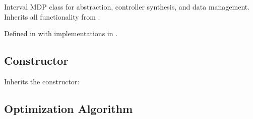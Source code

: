 \documentclass[a4paper,10pt,english]{sphinxmanual}
\begin{document}
\begin{fulllineitems}
\label{\detokenize{api/imdp:_CPPv44IMDP}}\label{\detokenize{api/imdp:_CPPv34IMDP}}\label{\detokenize{api/imdp:_CPPv24IMDP}}\label{\detokenize{api/imdp:IMDP}}
\pysigstartsignatures
\pysigstartmultiline
\pysigline
{}
\pysigstopmultiline
\pysigstopsignatures
\sphinxAtStartPar
Interval MDP class for abstraction, controller synthesis, and data management.
Inherits all functionality from {\hyperref[\detokenize{api/mdp:_CPPv43MDP}]{}}.

\sphinxAtStartPar
Defined in  with implementations in .


\subsection{Constructor}
\label{\detokenize{api/imdp:constructor}}
\sphinxAtStartPar
Inherits the {\hyperref[\detokenize{api/mdp:_CPPv43MDP}]{}} constructor:

\begin{sphinxVerbatim}[commandchars=\\\{\}]
\end{sphinxVerbatim}


\subsection{Optimization Algorithm}
\label{\detokenize{api/imdp:optimization-algorithm}}


\end{fulllineitems}
\end{document}
